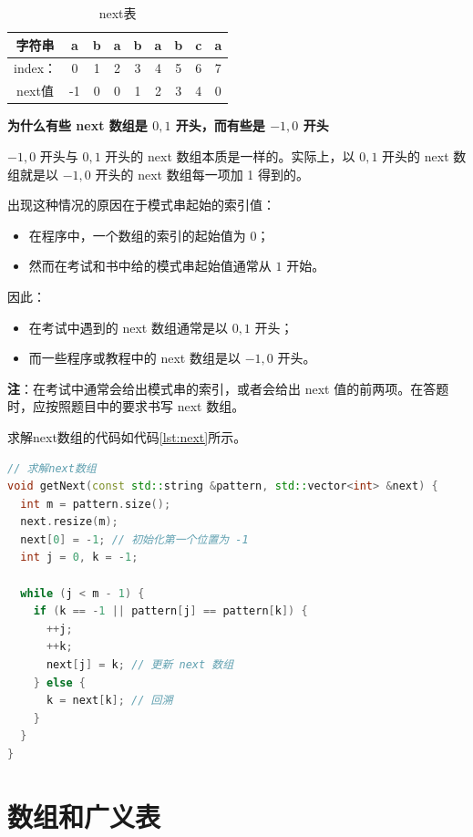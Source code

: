 \documentclass[lang=cn,newtx,10pt,scheme=chinese]{elegantbook}
\begin{document}
\begin{table}[htbp]
  \centering
  \caption{next表}
  \begin{tabular}{|c|c|c|c|c|c|c|c|c|}
    \hline
    字符串 & a & b & a & b & a & b & c & a \\
    \hline
    index： & 0 & 1 & 2 & 3 & 4 & 5 & 6 & 7 \\
    \hline
    next值 & -1 & 0 & 0 & 1 & 2 & 3 & 4 & 0 \\
    \hline
  \end{tabular}
  \label{table:next}
\end{table}

\textbf{为什么有些 next 数组是 $0, 1$ 开头，而有些是 $-1, 0$ 开头}

$-1, 0$ 开头与 $0, 1$ 开头的 next 数组本质是一样的。实际上，以 $0, 1$ 开头的 next 数组就是以 $-1, 0$ 开头的 next 数组每一项加 1 得到的。

出现这种情况的原因在于模式串起始的索引值：
\begin{itemize}
  \item 在程序中，一个数组的索引的起始值为 $0$；
  \item 然而在考试和书中给的模式串起始值通常从 $1$ 开始。
\end{itemize}

因此：
\begin{itemize}
  \item 在考试中遇到的 next 数组通常是以 $0, 1$ 开头；
  \item 而一些程序或教程中的 next 数组是以 $-1, 0$ 开头。
\end{itemize}

\textbf{注}：在考试中通常会给出模式串的索引，或者会给出 next 值的前两项。在答题时，应按照题目中的要求书写 next 数组。


求解next数组的代码如代码\ref{lst:next}所示。

\begin{lstlisting}[language=C++, caption={求解next数组示例代码}, label={lst:next}]
  // 求解next数组
void getNext(const std::string &pattern, std::vector<int> &next) {
  int m = pattern.size();
  next.resize(m);
  next[0] = -1; // 初始化第一个位置为 -1
  int j = 0, k = -1;

  while (j < m - 1) {
    if (k == -1 || pattern[j] == pattern[k]) {
      ++j;
      ++k;
      next[j] = k; // 更新 next 数组
    } else {
      k = next[k]; // 回溯
    }
  }
}

\end{lstlisting}
\chapter{数组和广义表}
\end{document}
